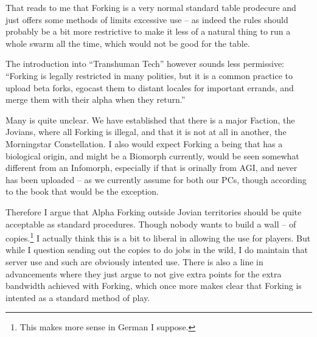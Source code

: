 That reads to me that Forking is a very normal standard table prodecure and just offers some methods of limits excessive use -- as indeed the rules should probably be a bit more restrictive to make it less of a natural thing to run a whole swarm all the time, which would not be good for the table.

The introduction into “Transhuman Tech” however sounds less permissive: “Forking is legally restricted in many polities, but it is a common practice to upload beta forks, egocast them to distant locales for important errands, and merge them with their alpha when they return.” \citep[pg. 286]{ep2e_1.1_2019}

Many is quite unclear. We have established that there is a major Faction, the Jovians, where all Forking is illegal, and that it is not at all in another, the Morningstar Constellation. I also would expect Forking a being that has a biological origin, and might be a Biomorph currently, would be seen somewhat different from an Infomorph, especially if that is orinally from AGI, and never has been uploaded -- as we currently assume for both our PCs, though according to the book that would be the exception.

Therefore I argue that Alpha Forking outside Jovian territories should be quite acceptable as standard procedures. Though nobody wants to build a wall -- of copies.\footnote{This makes more sense in German I suppose.} I actually think this is a bit to liberal in allowing the use for players. But while I question sending out the copies to do jobs in the wild, I do maintain that server use and such are obviously intented use. There is also a line in advancements where they just argue to not give extra points for the extra bandwidth achieved with Forking, which once more makes clear that Forking is intented as a standard method of play.
